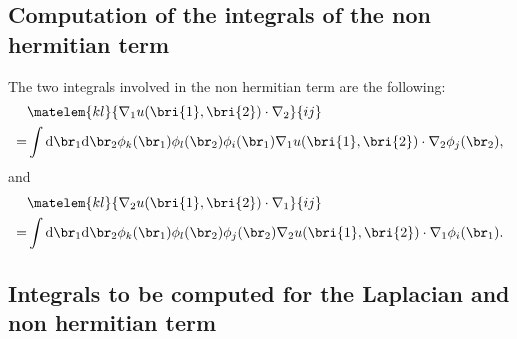 \subsection{Computation of the integrals of the non hermitian term}
The two integrals involved in the non hermitian term are the following: 
\begin{equation}
 \label{eq:nh_1}
 \begin{aligned}
&   \matelem{kl}{ \nabla_1 u(\bri{1},\bri{2}) \cdot \nabla_2 }{ij} \\ 
=& \int \text{d}\br_{1} \text{d}\br_{2} \phi_k(\br_1) \phi_l(\br_2) \phi_i(\br_1) \nabla_1 u(\bri{1},\bri{2}) \cdot \nabla_2 \phi_j(\br_2), 
 \end{aligned}
\end{equation}
and 
\begin{equation}
 \label{eq:nh_2}
 \begin{aligned}
&   \matelem{kl}{ \nabla_2 u(\bri{1},\bri{2}) \cdot \nabla_1 }{ij} \\ 
=& \int \text{d}\br_{1} \text{d}\br_{2} \phi_k(\br_1) \phi_l(\br_2) \phi_j(\br_2) \nabla_2 u(\bri{1},\bri{2}) \cdot \nabla_1 \phi_i(\br_1). 
 \end{aligned}
\end{equation}

\subsection{Integrals to be computed for the Laplacian and non hermitian term}
